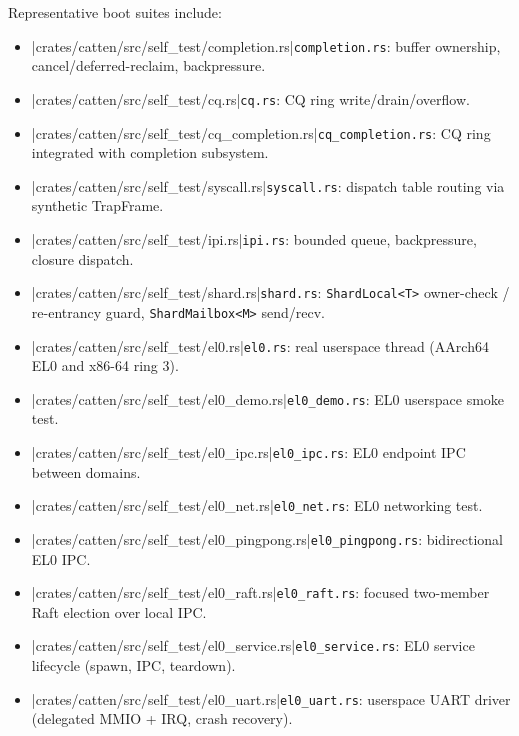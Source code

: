 Representative boot suites include:

\begin{itemize}
    \item \repofiletext|crates/catten/src/self_test/completion.rs|{\texttt{completion.rs}}: buffer ownership, cancel/deferred-reclaim,
        backpressure.
    \item \repofiletext|crates/catten/src/self_test/cq.rs|{\texttt{cq.rs}}: CQ ring write/drain/overflow.
    \item \repofiletext|crates/catten/src/self_test/cq_completion.rs|{\texttt{cq\_completion.rs}}: CQ ring integrated with completion
        subsystem.
    \item \repofiletext|crates/catten/src/self_test/syscall.rs|{\texttt{syscall.rs}}: dispatch table routing via synthetic
        TrapFrame.
    \item \repofiletext|crates/catten/src/self_test/ipi.rs|{\texttt{ipi.rs}}: bounded queue, backpressure, closure dispatch.
    \item \repofiletext|crates/catten/src/self_test/shard.rs|{\texttt{shard.rs}}: \texttt{ShardLocal<T>} owner-check /
        re-entrancy guard, \texttt{ShardMailbox<M>} send/recv.
    \item \repofiletext|crates/catten/src/self_test/el0.rs|{\texttt{el0.rs}}: real userspace thread (AArch64 EL0 and x86-64 ring 3).
    \item \repofiletext|crates/catten/src/self_test/el0_demo.rs|{\texttt{el0\_demo.rs}}: EL0 userspace smoke test.
    \item \repofiletext|crates/catten/src/self_test/el0_ipc.rs|{\texttt{el0\_ipc.rs}}: EL0 endpoint IPC between domains.
    \item \repofiletext|crates/catten/src/self_test/el0_net.rs|{\texttt{el0\_net.rs}}: EL0 networking test.
    \item \repofiletext|crates/catten/src/self_test/el0_pingpong.rs|{\texttt{el0\_pingpong.rs}}: bidirectional EL0 IPC.
    \item \repofiletext|crates/catten/src/self_test/el0_raft.rs|{\texttt{el0\_raft.rs}}: focused two-member Raft election over local IPC.
    \item \repofiletext|crates/catten/src/self_test/el0_service.rs|{\texttt{el0\_service.rs}}: EL0 service lifecycle (spawn, IPC,
        teardown).
    \item \repofiletext|crates/catten/src/self_test/el0_uart.rs|{\texttt{el0\_uart.rs}}: userspace UART driver (delegated MMIO +
        IRQ, crash recovery).

\end{itemize}
